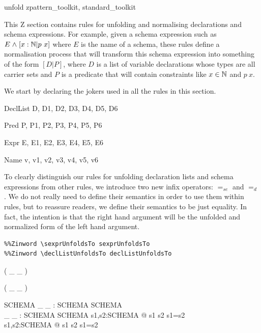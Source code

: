 \documentclass{entcs}
\newcommand{\sexprUnfoldsTo}{\mathrel{=_{se}}}
\newcommand{\declListUnfoldsTo}{\mathrel{=_d}}
\begin{document}
\begin{zsection}
  \SECTION unfold \parents zpattern\_toolkit, standard\_toolkit
\end{zsection}

This Z section contains rules for unfolding and normalising declarations
and schema expressions.  For example, given a schema expression such as 
$E \mathrel{\mathstrut{\wedge}} [x:{\mathbb N} | p~x]$ where $E$ is the name of a schema, these rules
define a normalisation process that will transform this schema expression
into something of the form $[D|P]$, where $D$ is a list of variable
declarations whose types are all carrier sets and $P$ is a predicate that
will contain constraints like $x \in {\mathbb N}$ and $p~x$.

We start by declaring the jokers used in all the rules in this section.

\begin{zedjoker}{DeclList} D, D1, D2, D3, D4, D5, D6 \end{zedjoker}
\begin{zedjoker}{Pred} P, P1, P2, P3, P4, P5, P6 \end{zedjoker}
\begin{zedjoker}{Expr} E, E1, E2, E3, E4, E5, E6 \end{zedjoker}
\begin{zedjoker}{Name} v, v1, v2, v3, v4, v5, v6 \end{zedjoker}

To clearly distinguish our rules for unfolding declaration lists and
schema expressions from other rules, we introduce two new infix
operators: $\sexprUnfoldsTo$ and $\declListUnfoldsTo$.  
We do not really need to define their semantics in order to use them within
rules, but to reassure readers, we define their semantics to be just
equality.  In fact, the intention is that the right hand argument
will be the unfolded and normalized form of the left hand argument.

\begin{verbatim}
%%Zinword \sexprUnfoldsTo sexprUnfoldsTo
%%Zinword \declListUnfoldsTo declListUnfoldsTo
\end{verbatim}

\begin{zed}
  \relation ( \_ \sexprUnfoldsTo \_ )
\end{zed}
\begin{zed}
  \relation ( \_ \declListUnfoldsTo \_ )
\end{zed}

\begin{gendef}{SCHEMA}
  \_ \sexprUnfoldsTo \_ : SCHEMA \rel SCHEMA \\
  \_ \declListUnfoldsTo \_ : SCHEMA \rel SCHEMA
\where
  \forall s1,s2:SCHEMA @ s1 \sexprUnfoldsTo s2 \iff s1=s2 \\
  \forall s1,s2:SCHEMA @ s1 \declListUnfoldsTo s2 \iff s1=s2 \\
\end{gendef}
\end{document}
